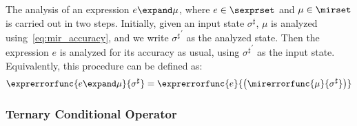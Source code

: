 The analysis of an expression $e \expand \mu$, where $e \in \sexprset$ and $\mu
\in \mirset$ is carried out in two steps.  Initially, given an input state
$\sigma^\sharp$, $\mu$ is analyzed using~\eqref{eq:mir_accuracy}, and we write
${\sigma^\sharp}^\prime$ as the analyzed state.  Then the expression $e$ is
analyzed for its accuracy as usual, using ${\sigma^\sharp}^\prime$ as the input
state.  Equivalently, this procedure can be defined as:
\begin{equation}
    \exprerrorfunc{e \expand \mu}{\sigma^\sharp}
    = \exprerrorfunc{e}{\left( \mirerrorfunc{\mu}{\sigma^\sharp} \right)}
\end{equation}

\subsubsection{Ternary Conditional Operator}

